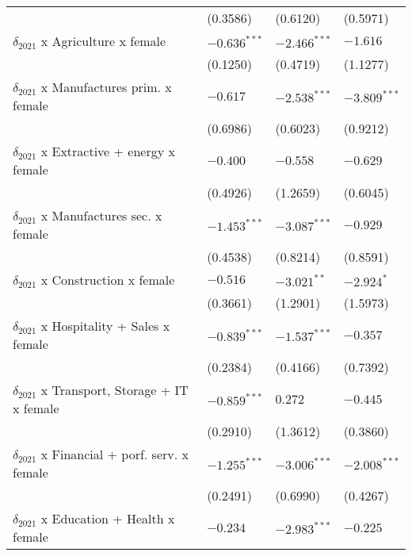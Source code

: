 \begin{tabular}{llll}
                                                   &        (0.3586) &        (0.6120) &        (0.5971) \\
$\delta_{2021}$ x Agriculture x female             &  $-0.636^{***}$ &  $-2.466^{***}$ &        $-1.616$ \\
                                                   &        (0.1250) &        (0.4719) &        (1.1277) \\
$\delta_{2021}$ x Manufactures prim. x female      &        $-0.617$ &  $-2.538^{***}$ &  $-3.809^{***}$ \\
                                                   &        (0.6986) &        (0.6023) &        (0.9212) \\
$\delta_{2021}$ x Extractive + energy x female     &        $-0.400$ &        $-0.558$ &        $-0.629$ \\
                                                   &        (0.4926) &        (1.2659) &        (0.6045) \\
$\delta_{2021}$ x Manufactures sec. x female       &  $-1.453^{***}$ &  $-3.087^{***}$ &        $-0.929$ \\
                                                   &        (0.4538) &        (0.8214) &        (0.8591) \\
$\delta_{2021}$ x Construction x female            &        $-0.516$ &   $-3.021^{**}$ &      $-2.924^*$ \\
                                                   &        (0.3661) &        (1.2901) &        (1.5973) \\
$\delta_{2021}$ x Hospitality + Sales x female     &  $-0.839^{***}$ &  $-1.537^{***}$ &        $-0.357$ \\
                                                   &        (0.2384) &        (0.4166) &        (0.7392) \\
$\delta_{2021}$ x Transport, Storage + IT x female &  $-0.859^{***}$ &         $0.272$ &        $-0.445$ \\
                                                   &        (0.2910) &        (1.3612) &        (0.3860) \\
$\delta_{2021}$ x Financial + porf. serv. x female &  $-1.255^{***}$ &  $-3.006^{***}$ &  $-2.008^{***}$ \\
                                                   &        (0.2491) &        (0.6990) &        (0.4267) \\
$\delta_{2021}$ x Education + Health x female      &        $-0.234$ &  $-2.983^{***}$ &        $-0.225$ \\

\end{tabular}
